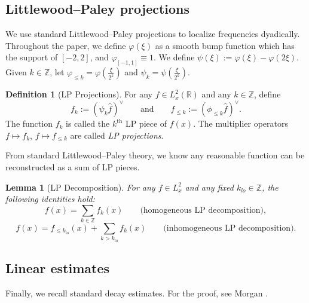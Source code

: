 \documentclass[reqno,english,11pt]{amsart}
\newcommand\Z{\mathbb{Z}}
\newtheorem{lemma}[theorem]{Lemma}
\theoremstyle{definition}
\newtheorem{definition}[theorem]{Definition}
\numberwithin{equation}{section}
\begin{document}
\subsection{Littlewood--Paley projections }

We use standard Littlewood--Paley projections to localize frequencies dyadically. Throughout the paper, we define $\varphi(\xi)$ as a smooth bump function which has the support of $[-2,2]$, and $\varphi_{[-1,1]}\equiv 1$. We define $\psi(\xi):=\varphi(\xi)-\varphi(2\xi)$. Given $k\in \Z$, let $\varphi_{\leq k}=\varphi(\frac{\xi}{2^k})$ and $\psi_k=\psi(\frac{\xi}{2^k})$. 


\begin{definition}[LP Projections]
For any $f \in L_x^2(\mathbb{R})$ and any $k \in \mathbb{Z}$, define
$$f_k := (\psi_k \widehat{f})^\vee\qquad \text{and} \qquad f_{\le k} := (\phi_{\le k} \widehat{f})^\vee.$$
The function $f_k$ is called the $k^{\text{th}}$ LP piece of $f(x)$.
The multiplier operators $f \mapsto f_k$, $f \mapsto f_{\le k}$ are called
\emph{LP projections}.
\end{definition}

From standard Littlewood–Paley theory, we know any reasonable function can be reconstructed as a sum of
LP pieces.

\begin{lemma}[LP Decomposition]
For any $f \in L_x^2$ and any fixed $k_{lo} \in \mathbb{Z}$, the following identities hold:
$$f(x) = \sum_{k \in \mathbb{Z}} f_k(x)\qquad \text{(homogeneous LP decomposition)},$$
$$f(x) = f_{\le k_{\operatorname{lo}}}(x) + \sum_{k > k_{\operatorname{lo}}} f_k(x)\qquad \text{(inhomogeneous LP decomposition)}.$$
\end{lemma}



\subsection{Linear estimates}






Finally, we recall standard decay estimates.   For the proof, see Morgan \cite{Morgan}.
\end{document}
